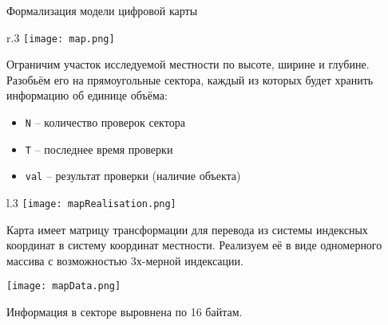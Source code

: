 \begin{tslide}{Формализация модели цифровой карты}

    \begin{wrapfigure}{r}{.3\linewidth}
    \texttt{[image: map.png]}
    \vspace{-2cm}
    \end{wrapfigure}
    Ограничим участок исследуемой местности по высоте, ширине и глубине.
    Разобьём его на прямоугольные сектора, каждый из которых будет хранить
    информацию об единице объёма:
    \begin{itemize}
    \item \verb|N| -- количество проверок сектора
    \item \verb|T| -- последнее время проверки
    \item \verb|val| -- результат проверки (наличие объекта)
    \end{itemize}


    \begin{wrapfigure}{l}{.3\linewidth}
    \texttt{[image: mapRealisation.png]}
    \end{wrapfigure}

    Карта имеет матрицу трансформации для перевода из системы индексных
    координат в систему координат местности. Реализуем её в виде одномерного
    массива с возможностью 3х-мерной индексации.

    \begin{flushright}
    \texttt{[image: mapData.png]}
    \end{flushright}

    Информация в секторе выровнена по 16 байтам.

\end{tslide}

